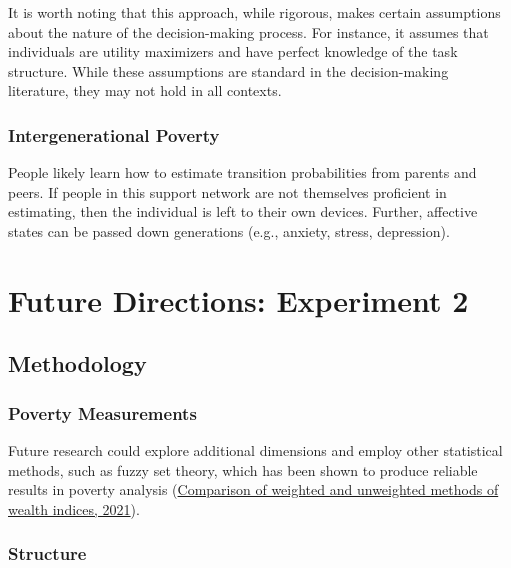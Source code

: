 \documentclass[
]{article}
\begin{document}
It is worth noting that this approach, while rigorous, makes certain
assumptions about the nature of the decision-making process. For
instance, it assumes that individuals are utility maximizers and have
perfect knowledge of the task structure. While these assumptions are
standard in the decision-making literature, they may not hold in all
contexts.

\hypertarget{intergenerational-poverty}{%
\subsubsection{Intergenerational
Poverty}\label{intergenerational-poverty}}

People likely learn how to estimate transition probabilities from
parents and peers. If people in this support network are not themselves
proficient in estimating, then the individual is left to their own
devices. Further, affective states can be passed down generations (e.g.,
anxiety, stress, depression).

\hypertarget{future-directions-experiment-2}{%
\section{Future Directions: Experiment
2}\label{future-directions-experiment-2}}

\hypertarget{methodology-2}{%
\subsection{Methodology}\label{methodology-2}}

\hypertarget{poverty-measurements}{%
\subsubsection{Poverty Measurements}\label{poverty-measurements}}

Future research could explore additional dimensions and employ other
statistical methods, such as fuzzy set theory, which has been shown to
produce reliable results in poverty analysis
(\href{https://www.ncbi.nlm.nih.gov/pmc/articles/PMC7921812/}{Comparison
of weighted and unweighted methods of wealth indices, 2021}).

\hypertarget{structure-2}{%
\subsubsection{Structure}\label{structure-2}}
\end{document}
